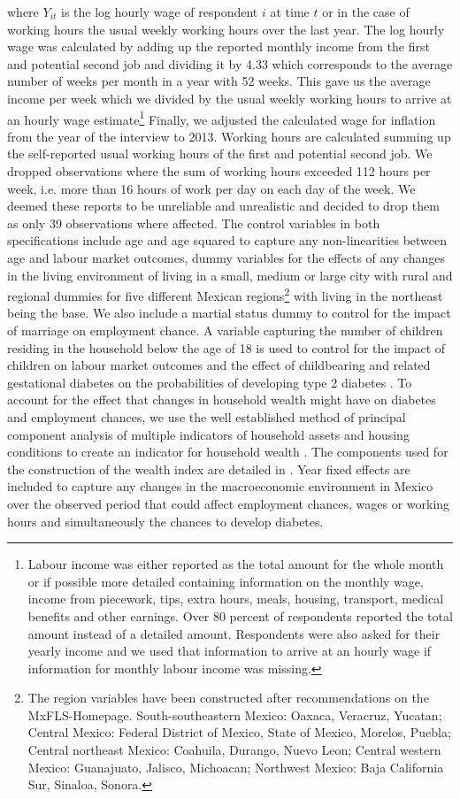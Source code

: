 where $Y_{it}$ is the log hourly wage of respondent $i$ at time
$t$ or in the case of working hours the usual weekly working hours
over the last year. The log hourly wage was calculated by adding up the reported monthly income from the first and potential second job and dividing it by 4.33 which corresponds to the average number of weeks per month in a year with 52 weeks. This gave us the average income per week which we divided by the usual weekly working hours to arrive at an hourly wage estimate\footnote{Labour income was either reported as the total amount for the whole month or if possible more detailed containing information on the monthly wage, income from piecework, tips, extra hours, meals, housing, transport, medical benefits and other earnings. Over 80 percent of respondents reported the total amount instead of a detailed amount. Respondents were also asked for their yearly income and we used that information to arrive at an hourly wage if information for monthly labour income was missing.} Finally, we adjusted the calculated wage for inflation from the year of the interview to 2013.  Working hours are calculated summing up the self-reported usual working hours of the first and potential second job. We dropped observations where the sum of working hours exceeded 112 hours per week, i.e. more than 16 hours of work per day on each day of the week. We deemed these reports to be unreliable and unrealistic and decided to drop them as only 39 observations  where affected. The control variables in both specifications include
age and age squared to capture any non-linearities between age and
labour market outcomes, dummy variables for the effects of any changes
in the living environment of living in a small, medium or large city
with rural and regional dummies for five different Mexican regions\footnote{The region variables have been constructed after recommendations on
the MxFLS-Homepage. South-southeastern Mexico: Oaxaca, Veracruz, Yucatan;
Central Mexico: Federal District of Mexico, State of Mexico, Morelos,
Puebla; Central northeast Mexico: Coahuila, Durango, Nuevo Leon; Central
western Mexico: Guanajuato, Jalisco, Michoacan; Northwest Mexico:
Baja California Sur, Sinaloa, Sonora.} with living in the northeast being the base. We also include a martial
status dummy to control for the impact of marriage on employment chance.
A variable capturing the number of children residing in the household
below the age of 18 is used to control for the impact of children
on labour market outcomes and the effect of childbearing and related
gestational diabetes on the probabilities of developing type 2 diabetes
\citep{Bellamy2009}. To account for the effect that changes in household
wealth might have on diabetes and employment chances, we use the well
established method of principal component analysis of multiple indicators
of household assets and housing conditions to create an indicator
for household wealth \citep{Filmer2001}. The components used for
the construction of the wealth index are detailed in \citet{Seuring2015}.
Year fixed effects are included to capture any changes in the macroeconomic
environment in Mexico over the observed period that could affect employment
chances, wages or working hours and simultaneously the chances to
develop diabetes.

